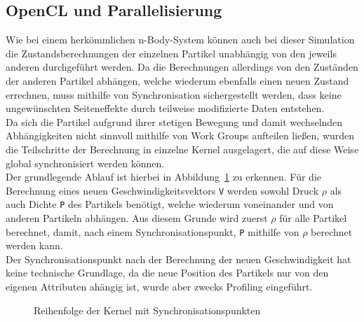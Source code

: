 \subsection{OpenCL und Parallelisierung}
Wie bei einem herkömmlichen n-Body-System können auch bei dieser Simulation die Zustandsberechnungen der einzelnen Partikel unabhängig von den jeweils anderen durchgeführt werden. Da die Berechnungen allerdings von den Zuständen der anderen Partikel abhängen, welche wiederum ebenfalls einen neuen Zustand errechnen, muss mithilfe von Synchronisation sichergestellt werden, dass keine ungewünschten Seiteneffekte durch teilweise modifizierte Daten entstehen.\\
Da sich die Partikel aufgrund ihrer stetigen Bewegung und damit wechselnden Abhängigkeiten nicht sinnvoll mithilfe von Work Groups aufteilen ließen, wurden die Teilschritte der Berechnung in einzelne Kernel ausgelagert, die auf diese Weise global synchronisiert werden können.\\
Der grundlegende Ablauf ist hierbei in Abbildung~\ref{fig:simulation_kernelablauf} zu erkennen. Für die Berechnung eines neuen Geschwindigkeitsvektors \texttt{V} werden sowohl Druck $\rho$  als auch Dichte \texttt{P} des Partikels benötigt, welche wiederum voneinander und von anderen Partikeln abhängen. Aus diesem Grunde wird zuerst $\rho$ für alle Partikel berechnet, damit, nach einem Synchronisationspunkt, \texttt{P} mithilfe von $\rho$ berechnet werden kann. \\
Der Synchronisationspunkt nach der Berechnung der neuen Geschwindigkeit hat keine technische Grundlage, da die neue Position des Partikels nur von den eigenen Attributen ahängig ist, wurde aber zwecks Profiling eingeführt.
\begin{figure}
  \centering
    
  \caption{Reihenfolge der Kernel mit Synchronisationspunkten}
  \label{fig:simulation_kernelablauf}
\end{figure}
